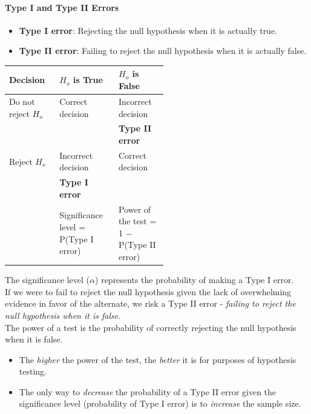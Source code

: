 \paragraph{Type I and Type II Errors} %
\label{par:Type I and Type II Errors}
\begin{itemize}
	\item \textbf{Type I error}: Rejecting the null hypothesis when it is actually true.
	\item \textbf{Type II error}: Failing to reject the null hypothesis when it is actually false.
\end{itemize}
\begin{table}[h!]
	\begin{center}
		\label{tab:Type I and II errors}
		\begin{tabular}{p{0.15\linewidth} | p{0.185\linewidth} | p{0.185\linewidth}}
			\toprule
			\textbf{Decision}   & \textbf{$H_o$ is True}               & \textbf{$H_o$ is False}                    \\
			\midrule
			Do not reject $H_o$ & Correct decision                     & Incorrect decision                         \\
			                    &                                      & \textbf{Type II error}                     \\
			\midrule
			Reject $H_o$        & Incorrect decision                   & Correct decision                           \\
			                    & \textbf{Type I error}                &                                            \\
			                    & Significance level = P(Type I error) & Power of the test = 1 $-$ P(Type II error) \\
			\bottomrule
		\end{tabular}
	\end{center}
\end{table}
The significance level ($\alpha$) represents the probability of making a Type I error.\\
If we were to fail to reject the null hypothesis given the lack of overwhelming evidence in favor of the alternate, we risk a Type II error - \textit{failing to reject the null hypothesis when it is false}.\\
The power of a test is the probability of correctly rejecting the null hypothesis when it is false.
\begin{itemize}
	\item[-] The \textit{higher} the power of the test, the \textit{better} it is for purposes of hypothesis testing.
	\item[-] The only way to \textit{decrease} the probability of a Type II error given the significance level (probability of Type I error) is to \textit{increase} the sample size.
\end{itemize}
